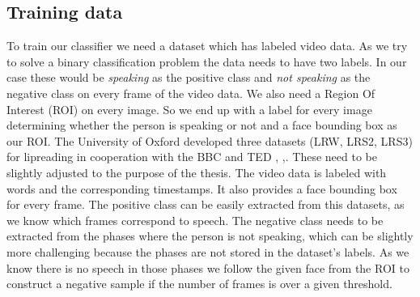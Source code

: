 \subsection{Training data}\label{ssec:data}
To train our classifier we need a dataset which has labeled video data. As we try to solve a binary classification problem the data needs to have two labels. In our case these would be \emph{speaking} as the positive class and \emph{not speaking} as the negative class on every frame of the video data. We also need a Region Of Interest (ROI) on every image. So we end up with a label for every image determining whether the person is speaking or not and a face bounding box as our ROI.
The University of Oxford developed three datasets (LRW, LRS2, LRS3) for lipreading in cooperation with the BBC and TED \cite{Chung16}, \cite{Chung17},\cite{Chung18}. These need to be slightly adjusted to the purpose of the thesis. The video data is labeled with words and the corresponding timestamps. It also provides a face bounding box for every frame.
The positive class can be easily extracted from this datasets, as we know which frames correspond to speech.
The negative class needs to be extracted from the phases where the person is not speaking, which can be slightly more challenging because the phases are not stored in the dataset's labels. As we know there is no speech in those phases we follow the given face from the ROI to construct a negative sample if the number of frames is over a given threshold.

